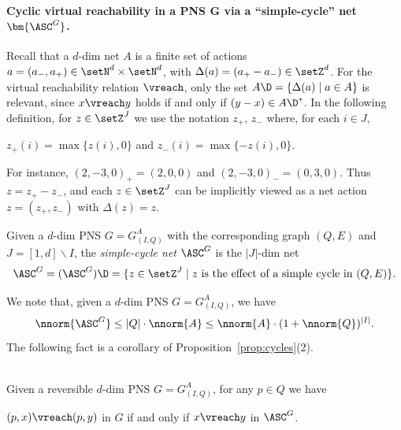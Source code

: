 \paragraph{Cyclic virtual reachability in a PNS $\bm{G}$ via a
``simple-cycle'' net $\bm{\ASC^G}$.}
Recall that a $d$-dim net $A$ is a finite set of actions
 $a=(a_-,a_+)\in\setN^d\times\setN^d$, with
$\Delta(a)=(a_+-a_-)\in\setZ^d$. For the virtual reachability relation $\vreach$,
only the set $A\D=\{\Delta(a)\mid a\in A\}$ is relevant, since
$x\vreach y$ holds
if and only if $(y-x)\in A\D^*$. 
In the following definition, for $z\in \setZ^J$ we
use the notation $z_+$, $z_-$ where, for each $i\in J$,
\begin{center}
$z_+(i)=\max\{z(i),0\}$ and $z_-(i)=\max\{-z(i),0\}$.
\end{center}
	For instance, $(2,-3,0)_+=(2,0,0)$ and  $(2,-3,0)_-=(0,3,0)$.
Thus $z=z_+-z_-$, and each $z\in\setZ^J$ can be implicitly viewed as
a net action $z=(z_+,z_-)$ with $\Delta(z)=z$.


\begin{defi}[\textbf{Simple-cycle \bm{$|J|$}-dim net \bm{$\ASC^G$} associated with
	a PNS \bm{$G=G^A_{(I,Q)}$}}]\label{def:ASC}
	Given a $d$-dim PNS $G=G^A_{(I,Q)}$ with the corresponding
	graph $(Q,E)$
and $J=[1,d]\smallsetminus I$, 
	the \emph{simple-cycle net} $\ASC^G$
is the $|J|$-dim net 
	\begin{equation*}
		\ASC^G=(\ASC^G)\D=\{z\in\setZ^J\mid z \text{ is the effect of a simple
		cycle in }(Q,E)\}.
	\end{equation*}

\end{defi}
\noindent
We note that, given a $d$-dim PNS $G=G^A_{(I,Q)}$, we have
\begin{equation}\label{eq:normASC}
\nnorm{\ASC^G}\leq |Q|\cdot\nnorm{A}\leq
	\nnorm{A}\cdot(1+\nnorm{Q})^{|I|}.
\end{equation}
The following fact is a corollary of
Proposition~\ref{prop:cycles}(2).

	\begin{cor}\label{cor:cycles}
\hfill\\
		Given a reversible $d$-dim PNS $G=G^A_{(I,Q)}$, for any $p\in Q$ we
		have 
		\begin{center}
		$(p,x)\vreach (p,y)$ in $G$ if and only if $x\vreach y$
		in $\ASC^G$.
		\end{center}			
	\end{cor}

